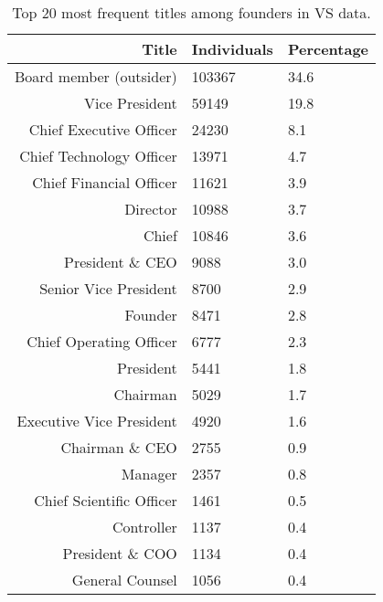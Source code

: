 \begin{table}[!htb]
\centering
\begingroup\footnotesize
\begin{tabular}{rll}
  \toprule
Title & Individuals & Percentage \\ 
  \midrule
Board member (outsider) & 103367 & 34.6 \\ 
  Vice President & 59149 & 19.8 \\ 
  Chief Executive Officer & 24230 & 8.1 \\ 
  Chief Technology Officer & 13971 & 4.7 \\ 
  Chief Financial Officer & 11621 & 3.9 \\ 
  Director & 10988 & 3.7 \\ 
  Chief & 10846 & 3.6 \\ 
  President \& CEO & 9088 & 3.0 \\ 
  Senior Vice President & 8700 & 2.9 \\ 
  Founder & 8471 & 2.8 \\ 
  Chief Operating Officer & 6777 & 2.3 \\ 
  President & 5441 & 1.8 \\ 
  Chairman & 5029 & 1.7 \\ 
  Executive Vice President & 4920 & 1.6 \\ 
  Chairman \& CEO & 2755 & 0.9 \\ 
  Manager & 2357 & 0.8 \\ 
  Chief Scientific Officer & 1461 & 0.5 \\ 
  Controller & 1137 & 0.4 \\ 
  President \& COO & 1134 & 0.4 \\ 
  General Counsel & 1056 & 0.4 \\ 
   \bottomrule
\end{tabular}
\endgroup
\caption{Top 20 most frequent titles among founders in VS data.} 
\label{table:VS_titlesSummaryTable}
\end{table}
